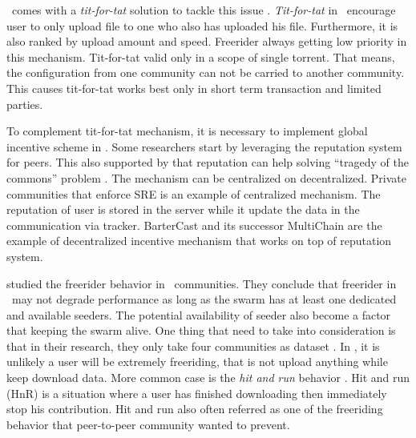\bt~comes with a \textit{tit-for-tat} solution to tackle this issue \cite{2003:bittorrent:cohen}. \textit{Tit-for-tat} in \bt~encourage user to only upload file to one who also has uploaded his file. Furthermore, it is also ranked by upload amount and speed. Freerider always getting low priority in this mechanism. Tit-for-tat valid only in a scope of single torrent. That means, the configuration from one community can not be carried to another community. This causes tit-for-tat works best only in short term transaction and limited parties.

To complement tit-for-tat mechanism, it is necessary to implement global incentive scheme in \bt. Some researchers start by leveraging the reputation system for peers. This also supported by \citeauthor{2002:reputationtotragedy:milinski} that reputation can help solving ``tragedy of the commons'' problem \cite{2002:reputationtotragedy:milinski}. The mechanism can be centralized on decentralized. Private communities that enforce SRE is an example of centralized mechanism. The reputation of user is stored in the server while it update the data in the communication via tracker. BarterCast \cite{2009:bartercast:meulpolder} and its successor MultiChain \cite{2015:multichain:norberhuis} are the example of decentralized incentive mechanism that works on top of reputation system. 

\citeauthor{2015:freeriderinbtcommunity:das} studied the freerider behavior in \bt~communities. They conclude that freerider in \bt~may not degrade performance as long as the swarm has at least one dedicated and available seeders. The potential availability of seeder also become a factor that keeping the swarm alive. One thing that need to take into consideration is that in their research, they only take four communities as dataset \cite{2015:freeriderinbtcommunity:das}. In \bt, it is unlikely a user will be extremely freeriding, that is not upload anything while keep download data. More common case is the \textit{hit and run} behavior \cite{2011:managesupplydemand:meulpolder}. Hit and run (HnR) is a situation where a user has finished downloading then immediately stop his contribution. Hit and run also often referred as one of the freeriding behavior that peer-to-peer community wanted to prevent.


